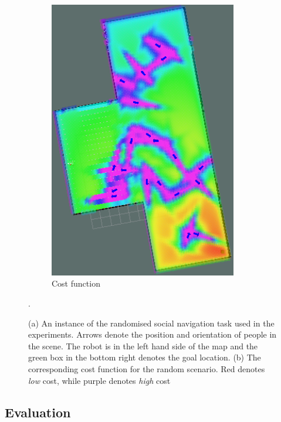\documentclass{article}  %
\begin{document}
\begin{figure}[tbh]
\begin{subfigure}[b]{0.435\columnwidth}
    \includegraphics[width=0.9\textwidth]{images/cost_f.png}
    \caption{Cost function}
    \label{fig:cost_f}
  \end{subfigure} 

  \caption{(a) An instance of the randomised social navigation task used in the experiments. Arrows denote the position and orientation of people in the scene. The robot is in the left hand side of the map and the green box in the bottom right denotes the goal location. (b) The corresponding cost function for the random scenario. Red denotes \emph{low} cost, while purple denotes \emph{high} cost}.
  \label{fig:setting}
  \end{figure}


	\subsection{Evaluation}
\end{document}
